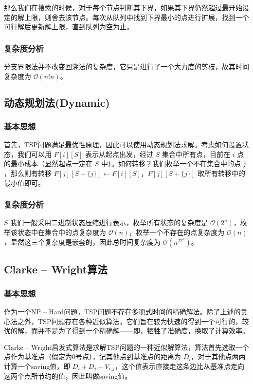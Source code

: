 \documentclass[lang=cn,11pt,a4paper]{elegantpaper}
\begin{document}
那么我们在搜索的时候，对于每个节点判断其下界，如果其下界仍然超过最开始设定的解上限，则舍去该节点。每次从队列中找到下界最小的点进行扩展，找到一个可行解后更新解上限，直到队列为空为止。

\subsubsection{复杂度分析}
分支界限法并不改变回溯法的复杂度，它只是进行了一个大力度的剪枝，故其时间复杂度为 $\mathcal{O}\left(n!n\right)$。


\subsection{动态规划法(Dynamic)}
\subsubsection{基本思想}
首先，TSP问题满足最优性原理，因此可以使用动态规划法求解。考虑如何设置状态，我们可以用 $F[i][S]$ 表示从起点出发，经过 $S$ 集合中所有点，目前在 $i$ 点的最小成本（显然起点一定在 $S$ 中）。如何转移？我们枚举一个不在集合中的点 $j$，那么则有转移 $F\left[j\right]\left[S+\{j\}\right]\gets F\left[i\right]\left[S\right]，F\left[j\right]\left[S+\{j\}\right]$ 取所有转移中的最小值即可。

\subsubsection{复杂度分析}
$S$ 我们一般采用二进制状态压缩进行表示，枚举所有状态的复杂度是 $\mathcal{O}\left(2^n\right)$，枚举该状态中在集合中的点复杂度为 $\mathcal{O}\left(n\right)$，枚举一个不存在的点复杂度为 $\mathcal{O}\left(n\right)$，显然这三个复杂度是嵌套的，因此总时间复杂度为 $\mathcal{O}\left(n^22^n\right)$。


\subsection{Clarke – Wright算法}
\subsubsection{基本思想}
作为一个NP – Hard问题，TSP问题不存在多项式时间的精确解法。除了上述的贪心法之外，TSP问题存在各种近似算法，它们旨在较为快速的得到一个可行的，较优的解，而并不是为了得到一个精确解——即，牺牲了准确度，换取了计算效率。

Clarke – Wright启发式算法是求解TSP问题的一种近似解算法，算法首先选取一个点作为基准点（假定为0号点），记其他点到基准点的距离为 $D_i$，对于其他点两两计算一个saving值，即 $D_i+D_j-V_{i,j}$，这个值表示直接走这条边比从基准点走向这两个点所节约的值，因此叫做saving值。
\end{document}
